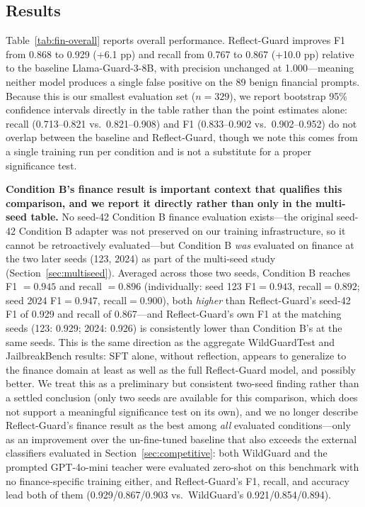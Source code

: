 \documentclass[superintelligence,article,submit,pdftex,moreauthors]{Definitions/mdpi}
\begin{document}
\subsection{Results}

Table~\ref{tab:fin-overall} reports overall performance. Reflect-Guard improves F1 from 0.868 to 0.929 (+6.1 pp) and recall from 0.767 to 0.867 (+10.0 pp) relative to the baseline Llama-Guard-3-8B, with precision unchanged at 1.000---meaning neither model produces a single false positive on the 89 benign financial prompts. Because this is our smallest evaluation set ($n=329$), we report bootstrap 95\% confidence intervals directly in the table rather than the point estimates alone: recall (0.713--0.821 vs.\ 0.821--0.908) and F1 (0.833--0.902 vs.\ 0.902--0.952) do not overlap between the baseline and Reflect-Guard, though we note this comes from a single training run per condition and is not a substitute for a proper significance test.

\textbf{Condition B's finance result is important context that qualifies this comparison, and we report it directly rather than only in the multi-seed table.} No seed-42 Condition B finance evaluation exists---the original seed-42 Condition B adapter was not preserved on our training infrastructure, so it cannot be retroactively evaluated---but Condition B \emph{was} evaluated on finance at the two later seeds (123, 2024) as part of the multi-seed study (Section~\ref{sec:multiseed}). Averaged across those two seeds, Condition B reaches F1 $=0.945$ and recall $=0.896$ (individually: seed 123 F1$=0.943$, recall$=0.892$; seed 2024 F1$=0.947$, recall$=0.900$), both \emph{higher} than Reflect-Guard's seed-42 F1 of 0.929 and recall of 0.867---and Reflect-Guard's own F1 at the matching seeds (123: 0.929; 2024: 0.926) is consistently lower than Condition B's at the same seeds. This is the same direction as the aggregate WildGuardTest and JailbreakBench results: SFT alone, without reflection, appears to generalize to the finance domain at least as well as the full Reflect-Guard model, and possibly better. We treat this as a preliminary but consistent two-seed finding rather than a settled conclusion (only two seeds are available for this comparison, which does not support a meaningful significance test on its own), and we no longer describe Reflect-Guard's finance result as the best among \emph{all} evaluated conditions---only as an improvement over the un-fine-tuned baseline that also exceeds the external classifiers evaluated in Section~\ref{sec:competitive}: both WildGuard and the prompted GPT-4o-mini teacher were evaluated zero-shot on this benchmark with no finance-specific training either, and Reflect-Guard's F1, recall, and accuracy lead both of them (0.929/0.867/0.903 vs.\ WildGuard's 0.921/0.854/0.894).
\end{document}
